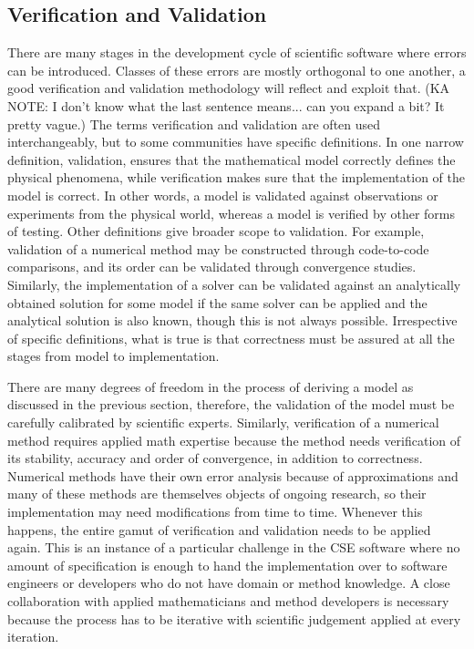 \subsection{Verification and Validation}
\label{sec:vandv}
There are many stages in the development cycle of scientific software 
where errors can be introduced. Classes of these errors are mostly
orthogonal to one another, a good verification and validation
methodology will reflect and exploit that.  (KA NOTE: I don't know what the last sentence means...  can you expand a bit?  It pretty vague.)
The terms verification and 
validation are often used interchangeably, but to some communities have specific definitions.  
In one narrow definition, validation, ensures that the
mathematical model correctly defines the physical phenomena, while
verification makes sure that the implementation of the model is
correct. In other words, a model is validated against observations or
experiments from the physical world, whereas a model is verified by other forms of testing.   Other definitions give broader scope to
validation. For example, validation of a numerical
method may be constructed through code-to-code comparisons, and its
order can be validated through convergence studies. Similarly, the
implementation of a solver can be validated against an analytically
obtained solution for some model if the same solver can be
applied and the analytical solution is also known, though this is not
always possible.  Irrespective of  specific definitions, what is true is that
correctness must be assured at all the stages from model to
implementation.  

There are many degrees of freedom in the process of deriving a
model as discussed in the previous section, therefore, the validation of the
model must be carefully calibrated by scientific experts. Similarly,
verification of a numerical method requires applied math expertise
because the method needs verification of its stability, accuracy and
order of convergence, in addition to correctness. Numerical methods
have their own error analysis because of approximations and many of
these methods are themselves objects of ongoing research, so their
implementation may need modifications from time to time. Whenever
this happens, the entire gamut of verification and validation needs to
be applied again. This is an instance of a particular challenge in the
CSE software where no amount of specification is enough to hand the
implementation over to software engineers or developers who do not have domain or method knowledge. A close
collaboration with applied mathematicians and method developers is necessary because the process has to be iterative with
scientific judgement applied at every iteration. 


